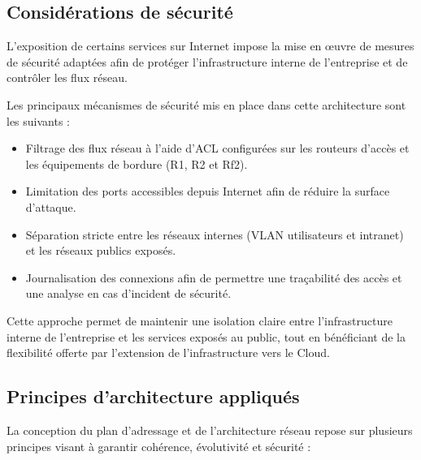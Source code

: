 \documentclass[12pt,a4paper, oneside]{memoir}
\begin{document}

\subsection{Considérations de sécurité}

L’exposition de certains services sur Internet impose la mise en œuvre
de mesures de sécurité adaptées afin de protéger l’infrastructure
interne de l’entreprise et de contrôler les flux réseau.

Les principaux mécanismes de sécurité mis en place dans cette architecture sont les suivants :

\begin{itemize}
	\item Filtrage des flux réseau à l’aide d’ACL configurées sur les routeurs d’accès et les équipements de bordure (R1, R2 et Rf2).
	\item Limitation des ports accessibles depuis Internet afin de réduire la surface d’attaque.
	\item Séparation stricte entre les réseaux internes (VLAN utilisateurs et intranet) et les réseaux publics exposés.
	\item Journalisation des connexions afin de permettre une traçabilité des accès et une analyse en cas d’incident de sécurité.
\end{itemize}

Cette approche permet de maintenir une isolation claire entre
l’infrastructure interne de l’entreprise et les services exposés au public,
tout en bénéficiant de la flexibilité offerte par l’extension de
l’infrastructure vers le Cloud.

\subsection{Principes d’architecture appliqués}

La conception du plan d’adressage et de l’architecture réseau repose sur plusieurs principes visant à garantir cohérence, évolutivité et sécurité :
\end{document}
